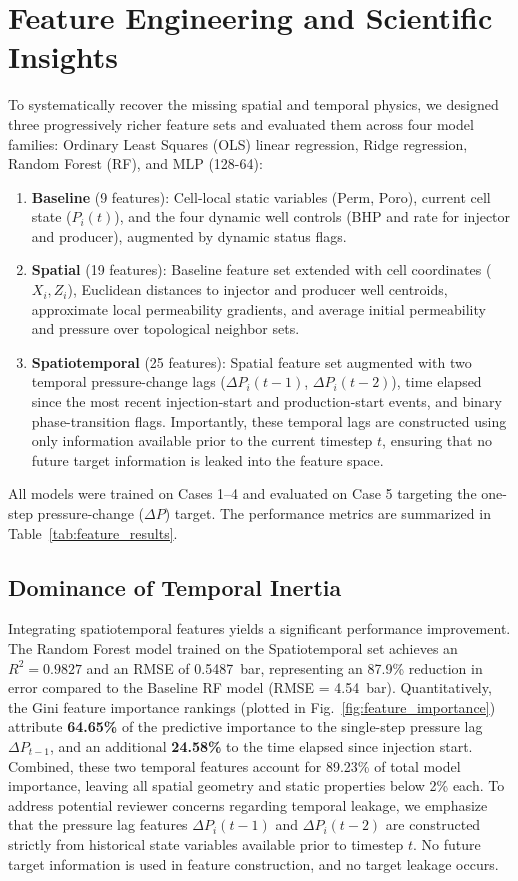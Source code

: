 \section{Feature Engineering and Scientific Insights}
To systematically recover the missing spatial and temporal physics, we designed three progressively richer feature sets and evaluated them across four model families: Ordinary Least Squares (OLS) linear regression, Ridge regression, Random Forest (RF), and MLP (128-64):
\begin{enumerate}
    \item \textbf{Baseline} (9 features): Cell-local static variables ($\text{Perm}$, $\text{Poro}$), current cell state ($P_i(t)$), and the four dynamic well controls (BHP and rate for injector and producer), augmented by dynamic status flags.
    \item \textbf{Spatial} (19 features): Baseline feature set extended with cell coordinates ($X_i, Z_i$), Euclidean distances to injector and producer well centroids, approximate local permeability gradients, and average initial permeability and pressure over topological neighbor sets.
    \item \textbf{Spatiotemporal} (25 features): Spatial feature set augmented with two temporal pressure-change lags ($\Delta P_i(t-1)$, $\Delta P_i(t-2)$), time elapsed since the most recent injection-start and production-start events, and binary phase-transition flags. Importantly, these temporal lags are constructed using only information available prior to the current timestep $t$, ensuring that no future target information is leaked into the feature space.
\end{enumerate}

All models were trained on Cases 1--4 and evaluated on Case 5 targeting the one-step pressure-change ($\Delta P$) target. The performance metrics are summarized in Table~\ref{tab:feature_results}.

\subsection{Dominance of Temporal Inertia}
Integrating spatiotemporal features yields a significant performance improvement. The Random Forest model trained on the Spatiotemporal set achieves an $R^2 = 0.9827$ and an RMSE of 0.5487~bar, representing an 87.9\% reduction in error compared to the Baseline RF model (RMSE = 4.54~bar). Quantitatively, the Gini feature importance rankings (plotted in Fig.~\ref{fig:feature_importance}) attribute \textbf{64.65\%} of the predictive importance to the single-step pressure lag $\Delta P_{t-1}$, and an additional \textbf{24.58\%} to the time elapsed since injection start. Combined, these two temporal features account for 89.23\% of total model importance, leaving all spatial geometry and static properties below 2\% each. To address potential reviewer concerns regarding temporal leakage, we emphasize that the pressure lag features $\Delta P_i(t-1)$ and $\Delta P_i(t-2)$ are constructed strictly from historical state variables available prior to timestep $t$. No future target information is used in feature construction, and no target leakage occurs.

